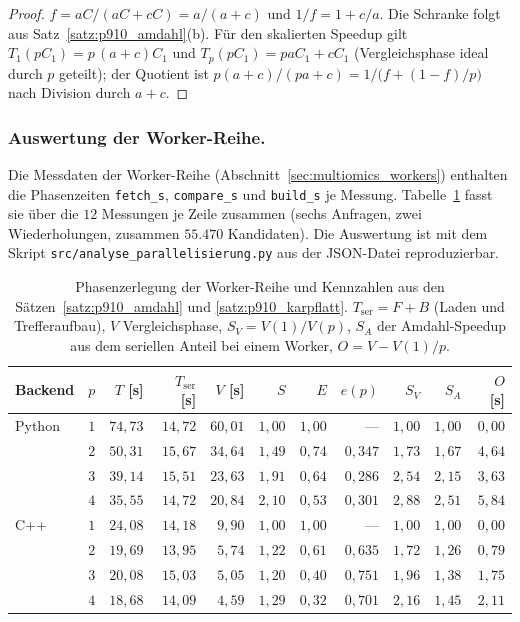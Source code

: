 \documentclass[a4paper,12pt, twoside]{report}
\theoremstyle{definition}
\begin{document}
\begin{proof}
$f=aC/(aC+cC)=a/(a+c)$ und $1/f=1+c/a$. Die Schranke folgt aus Satz~\ref{satz:p910_amdahl}(b). Für den skalierten Speedup gilt $T_1(pC_1)=p\,(a+c)C_1$ und $T_p(pC_1)=paC_1+cC_1$ (Vergleichsphase ideal durch $p$ geteilt); der Quotient ist $p(a+c)/(pa+c)=1/\bigl(f+(1-f)/p\bigr)$ nach Division durch $a+c$.
\end{proof}

\subsubsection{Auswertung der Worker-Reihe.}
Die Messdaten der Worker-Reihe (Abschnitt~\ref{sec:multiomics_workers}) enthalten die Phasenzeiten \texttt{fetch\_s}, \texttt{compare\_s} und \texttt{build\_s} je Messung. Tabelle~\ref{tab:p910_phasen} fasst sie über die $12$ Messungen je Zeile zusammen (sechs Anfragen, zwei Wiederholungen, zusammen $55.470$ Kandidaten). Die Auswertung ist mit dem Skript \texttt{src/analyse\_parallelisierung.py} aus der JSON-Datei reproduzierbar.

\begin{table}[!htbp]
\centering
\small
\caption{Phasenzerlegung der Worker-Reihe und Kennzahlen aus den Sätzen~\ref{satz:p910_amdahl} und \ref{satz:p910_karpflatt}. $T_{\mathrm{ser}}=F+B$ (Laden und Trefferaufbau), $V$ Vergleichsphase, $S_V=V(1)/V(p)$, $S_A$ der Amdahl-Speedup aus dem seriellen Anteil bei einem Worker, $O=V-V(1)/p$.}
\label{tab:p910_phasen}
\begin{tabular}{@{}llrrrrrrrrr@{}}
\toprule
Backend & $p$ & $T$ [s] & $T_{\mathrm{ser}}$ [s] & $V$ [s] & $S$ & $E$ & $e(p)$ & $S_V$ & $S_A$ & $O$ [s] \\
\midrule
Python & $1$ & $74{,}73$ & $14{,}72$ & $60{,}01$ & $1{,}00$ & $1{,}00$ & --- & $1{,}00$ & $1{,}00$ & $0{,}00$ \\
 & $2$ & $50{,}31$ & $15{,}67$ & $34{,}64$ & $1{,}49$ & $0{,}74$ & $0{,}347$ & $1{,}73$ & $1{,}67$ & $4{,}64$ \\
 & $3$ & $39{,}14$ & $15{,}51$ & $23{,}63$ & $1{,}91$ & $0{,}64$ & $0{,}286$ & $2{,}54$ & $2{,}15$ & $3{,}63$ \\
 & $4$ & $35{,}55$ & $14{,}72$ & $20{,}84$ & $2{,}10$ & $0{,}53$ & $0{,}301$ & $2{,}88$ & $2{,}51$ & $5{,}84$ \\
\midrule
C++ & $1$ & $24{,}08$ & $14{,}18$ & $9{,}90$ & $1{,}00$ & $1{,}00$ & --- & $1{,}00$ & $1{,}00$ & $0{,}00$ \\
 & $2$ & $19{,}69$ & $13{,}95$ & $5{,}74$ & $1{,}22$ & $0{,}61$ & $0{,}635$ & $1{,}72$ & $1{,}26$ & $0{,}79$ \\
 & $3$ & $20{,}08$ & $15{,}03$ & $5{,}05$ & $1{,}20$ & $0{,}40$ & $0{,}751$ & $1{,}96$ & $1{,}38$ & $1{,}75$ \\
 & $4$ & $18{,}68$ & $14{,}09$ & $4{,}59$ & $1{,}29$ & $0{,}32$ & $0{,}701$ & $2{,}16$ & $1{,}45$ & $2{,}11$ \\
\bottomrule
\end{tabular}
\end{table}
\end{document}
